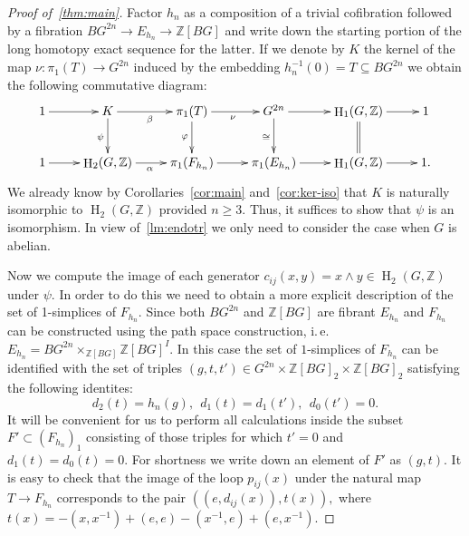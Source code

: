\documentclass[oneside, 10pt]{amsart}
\theoremstyle{plain}
\numberwithin{equation}{section}
\numberwithin{lemma}{section}
\theoremstyle{remark}
\theoremstyle{definition}
\DeclareMathOperator{\HH}{H}
\newcommand{\ZZ}{\mathbb{Z}}
\begin{document}
\begin{proof}[Proof of~\cref{thm:main}]
Factor $h_n$ as a composition of a trivial cofibration followed by a fibration $BG^{2n}\to E_{h_n} \to \ZZ[BG]$ and
write down the starting portion of the long homotopy exact sequence for the latter.
If we denote by $K$ the kernel of the map $\nu\colon \pi_1(T) \to G^{2n}$ induced by the embedding $h_n^{-1}(0)=T \subseteq BG^{2n}$ we obtain the following commutative diagram:
\[ \xymatrix{1 \ar[r] & K       \ar[d]_{\psi} \ar[r]_{\beta} & \pi_1(T) \ar[d]_{\varphi} \ar[r]_{\nu}     & G^{2n} \ar[r] \ar[d]_{\cong} & \HH_1(G, \ZZ) \ar[r] \ar@{=}[d] & 1 \\
             1 \ar[r] & \HH_2(G, \ZZ) \ar[r]_{\alpha} & \pi_1(F_{h_n})           \ar[r]  & \pi_1(E_{h_n}) \ar[r]                       & \HH_1(G, \ZZ) \ar[r] & 1.}\]
We already know by Corollaries~\ref{cor:main} and~\ref{cor:ker-iso} that $K$ is naturally isomorphic to $\HH_2(G, \ZZ)$ provided $n\geq 3$.
Thus, it suffices to show that $\psi$ is an isomorphism. In view of~\cref{lm:endotr} we only need to consider the case when $G$ is abelian.

Now we compute the image of each generator $c_{ij}(x, y) = x \wedge y \in \HH_2(G, \ZZ)$ under $\psi$.
In order to do this we need to obtain a more explicit description of the set of 1-simplices of $F_{h_n}$.
Since both $BG^{2n}$ and $\ZZ[BG]$ are fibrant $E_{h_n}$ and $F_{h_n}$ can be constructed using the path space construction, i.\,e. $E_{h_n} = BG^{2n} \times_{\ZZ[BG]} \ZZ[BG]^I$.
In this case the set of $1$-simplices of $F_{h_n}$ can be identified with the set of triples $(g, t, t') \in G^{2n}\times \ZZ[BG]_2 \times \ZZ[BG]_2$ 
 satisfying the following identites:
\[d_2(t) = h_n(g),\ \ d_1(t) = d_1(t'),\ \ d_0(t') = 0.\]
It will be convenient for us to perform all calculations inside the subset $F'\subset (F_{h_n})_1$ consisting of those triples for which $t'=0$ and $d_1(t)=d_0(t)=0$.
For shortness we write down an element of $F'$ as $(g, t)$.
It is easy to check that the image of the loop $p_{ij}(x)$ under the natural map $T \to F_{h_n}$ corresponds to the pair
$((e, d_{ij}(x)), t(x)),$ where $t(x)=-(x, x^{-1}) + (e, e) - (x^{-1}, e) + (e, x^{-1})$.


\end{proof}
\end{document}
